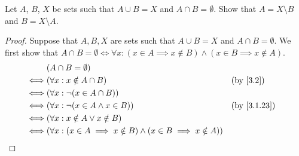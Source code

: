 \begin{ex}\label{ex:3.1.9}
  Let \(A\), \(B\), \(X\) be sets such that \(A \cup B = X\) and \(A \cap B = \emptyset\).
  Show that \(A = X \setminus B\) and \(B = X \setminus A\).
\end{ex}

\begin{proof}
  Suppose that \(A, B, X\) are sets such that \(A \cup B = X\) and \(A \cap B = \emptyset\).
  We first show that \(A \cap B = \emptyset \iff \forall x : (x \in A \implies x \notin B) \land (x \in B \implies x \notin A)\).
  \begin{align*}
         & (A \cap B = \emptyset)                                                                                      \\
    \iff & (\forall x : x \notin A \cap B)                                                 &  & \text{(by \cref{3.2})} \\
    \iff & (\forall x : \lnot (x \in A \cap B))                                                                        \\
    \iff & (\forall x : \lnot (x \in A \land x \in B))                                     &  & \by{3.1.23}            \\
    \iff & (\forall x : x \notin A \lor x \notin B)                                                                    \\
    \iff & (\forall x : (x \in A \implies x \notin B) \land (x \in B \implies x \notin A))                             \\
  \end{align*}


\end{proof}
